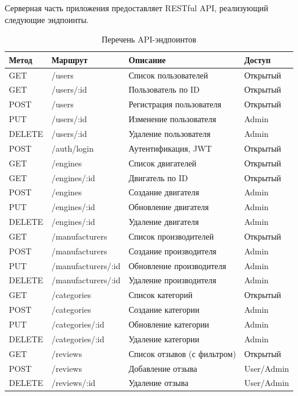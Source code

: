 \documentclass[14pt,a4paper]{extarticle}
\begin{document}
Серверная часть приложения предоставляет RESTful API, реализующий следующие эндпоинты.

\begin{table}[h!]
\caption{Перечень API-эндпоинтов}
\begin{tabular}{|p{1.5cm}|p{5cm}|p{5.5cm}|p{2cm}|}
\hline
\textbf{Метод} & \textbf{Маршрут} & \textbf{Описание} & \textbf{Доступ} \\
\hline
GET    & /users              & Список пользователей         & Открытый \\
GET    & /users/:id          & Пользователь по ID           & Открытый \\
POST   & /users              & Регистрация пользователя     & Открытый \\
PUT    & /users/:id          & Изменение пользователя       & Admin \\
DELETE & /users/:id          & Удаление пользователя        & Admin \\
POST   & /auth/login         & Аутентификация, JWT          & Открытый \\
GET    & /engines            & Список двигателей            & Открытый \\
GET    & /engines/:id        & Двигатель по ID              & Открытый \\
POST   & /engines            & Создание двигателя           & Admin \\
PUT    & /engines/:id        & Обновление двигателя         & Admin \\
DELETE & /engines/:id        & Удаление двигателя           & Admin \\
GET    & /manufacturers      & Список производителей        & Открытый \\
POST   & /manufacturers      & Создание производителя       & Admin \\
PUT    & /manufacturers/:id  & Обновление производителя     & Admin \\
DELETE & /manufacturers/:id  & Удаление производителя       & Admin \\
GET    & /categories         & Список категорий             & Открытый \\
POST   & /categories         & Создание категории           & Admin \\
PUT    & /categories/:id     & Обновление категории         & Admin \\
DELETE & /categories/:id     & Удаление категории           & Admin \\
GET    & /reviews            & Список отзывов (с фильтром) & Открытый \\
POST   & /reviews            & Добавление отзыва            & User/Admin \\
DELETE & /reviews/:id        & Удаление отзыва              & User/Admin \\
\hline
\end{tabular}
\end{table}
\end{document}
